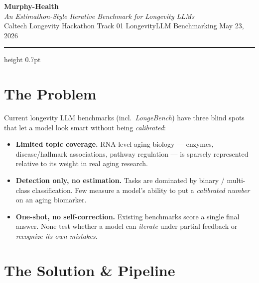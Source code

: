 \documentclass[10pt,letterpaper]{article}
\begin{document}
\begin{center}
{\huge\bfseries\color{bamboodark} Murphy-Health}\\[2pt]
{\footnotesize\color{bamboomid}\itshape An Estimathon-Style Iterative Benchmark for Longevity LLMs}\\[1pt]
{\scriptsize Caltech Longevity Hackathon \textbullet{} Track 01 \textbullet{} LongevityLLM Benchmarking \textbullet{} May 23, 2026}
\end{center}
\vspace{-3pt}
{\color{bamboomid}\hrule height 0.7pt}
\vspace{2pt}

\section*{The Problem}
\noindent\footnotesize
Current longevity LLM benchmarks (incl.\ \emph{LongeBench}) have three blind spots that let a model look smart without being \emph{calibrated}:
\begin{itemize}
  \item \textbf{Limited topic coverage.} RNA-level aging biology --- enzymes, disease/hallmark associations, pathway regulation --- is sparsely represented relative to its weight in real aging research.
  \item \textbf{Detection only, no estimation.} Tasks are dominated by binary / multi-class classification. Few measure a model's ability to put a \emph{calibrated number} on an aging biomarker.
  \item \textbf{One-shot, no self-correction.} Existing benchmarks score a single final answer. None test whether a model can \emph{iterate} under partial feedback or \emph{recognize its own mistakes}.
\end{itemize}

\section*{The Solution \& Pipeline}
\vspace{1pt}
\end{document}
